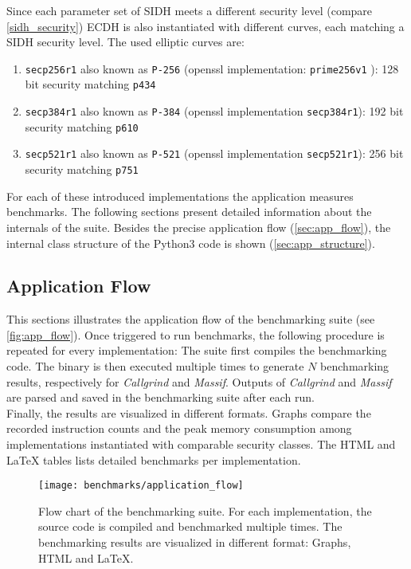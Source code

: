 Since each parameter set of \gls{SIDH} meets a different security level (compare \autoref{sidh_security}) \gls{ECDH} is also instantiated with different curves, each matching a \gls{SIDH} security level. The used elliptic curves are:
\begin{enumerate}
\item \texttt{secp256r1} also known as \texttt{P-256} (\gls{openssl} implementation: \texttt{prime256v1} \parencite{turner2009elliptic}): 128 bit security matching \texttt{p434} \parencite{brown2010sec}
\item \texttt{secp384r1} also known as \texttt{P-384} (\gls{openssl} implementation \texttt{secp384r1}): 192 bit security matching \texttt{p610} \parencite{brown2010sec}
\item \texttt{secp521r1} also known as \texttt{P-521} (\gls{openssl} implementation \texttt{secp521r1}): 256 bit security  matching \texttt{p751} \parencite{brown2010sec}
\end{enumerate}
For each of these introduced implementations the application measures benchmarks. The following sections present detailed information about the internals of the suite. Besides the precise application flow (\autoref{sec:app_flow}), the internal class structure of the Python3 code is shown (\autoref{sec:app_structure}).

\subsection{Application Flow}\label{sec:app_flow}
This sections illustrates the application flow of the benchmarking suite (see \autoref{fig:app_flow}). Once triggered to run benchmarks, the following procedure is repeated for every implementation: The suite first compiles the benchmarking code. The binary is then executed multiple times to generate $N$ benchmarking results, respectively for \textit{Callgrind} and \textit{Massif}. Outputs of \textit{Callgrind} and \textit{Massif} are parsed and saved in the benchmarking suite after each run.
\\
Finally, the results are visualized in different formats. Graphs compare the recorded instruction counts and the peak memory consumption among implementations instantiated with comparable security classes. The \gls{HTML} and LaTeX tables lists detailed benchmarks per implementation.

\begin{figure}[H]
  \centering
  \texttt{[image: benchmarks/application\_flow]}
  \caption[Flow chart of the benchmarking suite.]
  {Flow chart of the benchmarking suite. For each implementation, the source code is compiled and benchmarked multiple times. The benchmarking results are visualized in different format: Graphs, \gls{HTML} and LaTeX.
  } \label{fig:app_flow}
\end{figure}




